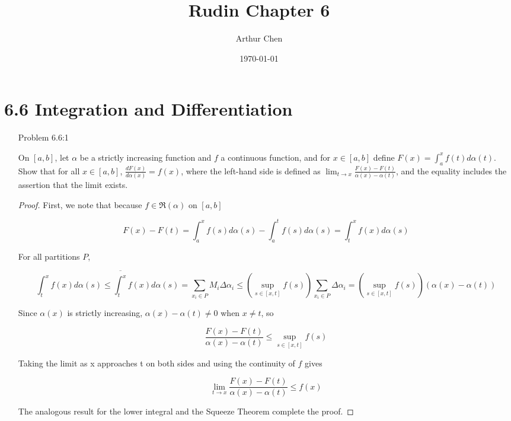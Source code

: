 \documentclass{amsart}
\author{Arthur Chen}
\title{Rudin Chapter 6}
\date{\today}
\newcommand{\upRiemannint}[2]{
  \overline{\int_{#1}^{#2}}
}
\begin{document}
\section*{6.6 Integration and Differentiation}

\begin{enumerate}

\item[Problem 6.6:1]

On $[a, b]$, let $\alpha$ be a strictly increasing function and $f$ a continuous function, and for $x \in [a, b]$ define $F(x) = \int_a^x f(t) d\alpha(t)$. Show that for all $x \in [a, b]$, $\frac{dF(x)}{d \alpha(x)} = f(x)$, where the left-hand side is defined as $\lim_{t \to x} \frac{F(x) - F(t)}{\alpha(x) - \alpha(t)}$, and the equality includes the assertion that the limit exists.

\begin{proof}

First, we note that because $f \in \mathfrak{R}(\alpha)$ on $[a, b]$

\[F(x) - F(t) = \int_a^x f(s)d\alpha(s) - \int_a^t f(s) d\alpha(s) = \int_t^x f(x) d\alpha(s)
\]

For all partitions $P$,

\[
\int_t^x f(x) d\alpha(s) 
\leq \upRiemannint{t}{x} f(x) d\alpha(s) 
= \sum_{x_i \in P} M_i \Delta \alpha_i
\leq (\sup_{s \in [x, t]} f(s)) \sum_{x_i \in P} \Delta \alpha_i
= (\sup_{s \in [x, t]} f(s))(\alpha(x) - \alpha(t))
\]

Since $\alpha(x)$ is strictly increasing, $\alpha(x) - \alpha(t) \neq 0$ when $x \neq t$, so

\[
\frac{F(x) - F(t)}{\alpha(x) - \alpha(t)} \leq \sup_{s \in [x, t]} f(s)
\]

Taking the limit as x approaches t on both sides and using the continuity of $f$ gives

\[
\lim_{t \to x} \frac{F(x) - F(t)}{\alpha(x) - \alpha(t)} \leq f(x)
\]

The analogous result for the lower integral and the Squeeze Theorem complete the proof.

\end{proof}

\end{enumerate}
\end{document}

